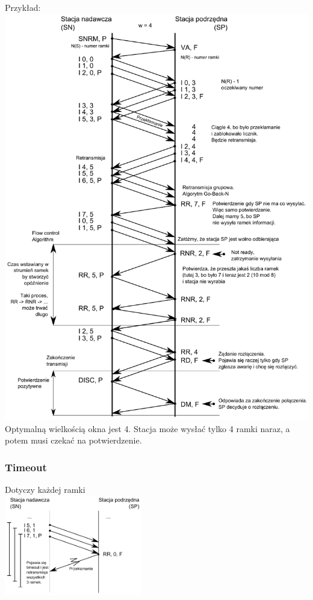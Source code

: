 \documentclass[a4paper,twoside]{article}
\begin{document}
	Przykład:\\
	\includegraphics[width=14cm]{./images/image14.pdf}\\
	Optymalną wielkością okna jest 4. Stacja może wysłać tylko 4 ramki naraz, a potem musi czekać na potwierdzenie.
	\subsubsection{Timeout}
		Dotyczy każdej ramki\\
		\includegraphics[width=6cm]{./images/image15.pdf}
\end{document}
